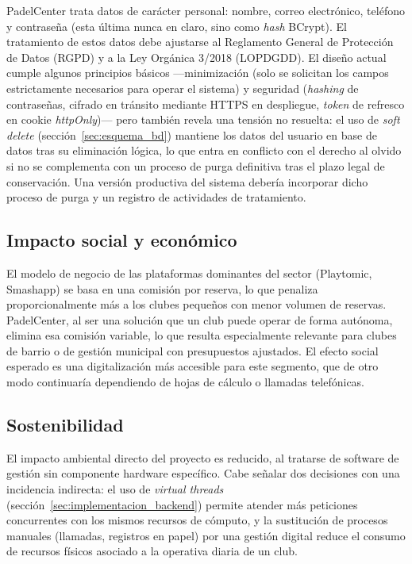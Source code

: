 PadelCenter trata datos de carácter personal: nombre, correo electrónico,
teléfono y contraseña (esta última nunca en claro, sino como \textit{hash}
BCrypt). El tratamiento de estos datos debe ajustarse al Reglamento General de
Protección de Datos (RGPD) y a la Ley Orgánica 3/2018 (LOPDGDD). El diseño
actual cumple algunos principios básicos —minimización (solo se solicitan los
campos estrictamente necesarios para operar el sistema) y seguridad
(\textit{hashing} de contraseñas, cifrado en tránsito mediante HTTPS en
despliegue, \textit{token} de refresco en cookie \textit{httpOnly})— pero
también revela una tensión no resuelta: el uso de \textit{soft delete}
(sección~\ref{sec:esquema_bd}) mantiene los datos del usuario en base de datos
tras su eliminación lógica, lo que entra en conflicto con el derecho al olvido
si no se complementa con un proceso de purga definitiva tras el plazo legal de
conservación. Una versión productiva del sistema debería incorporar dicho
proceso de purga y un registro de actividades de tratamiento.

\subsection{Impacto social y económico}

El modelo de negocio de las plataformas dominantes del sector (Playtomic,
Smashapp) se basa en una comisión por reserva, lo que penaliza
proporcionalmente más a los clubes pequeños con menor volumen de reservas.
PadelCenter, al ser una solución que un club puede operar de forma autónoma,
elimina esa comisión variable, lo que resulta especialmente relevante para
clubes de barrio o de gestión municipal con presupuestos ajustados. El efecto
social esperado es una digitalización más accesible para este segmento, que
de otro modo continuaría dependiendo de hojas de cálculo o llamadas
telefónicas.

\subsection{Sostenibilidad}

El impacto ambiental directo del proyecto es reducido, al tratarse de software
de gestión sin componente hardware específico. Cabe señalar dos decisiones con
una incidencia indirecta: el uso de \textit{virtual threads}
(sección~\ref{sec:implementacion_backend}) permite atender más peticiones
concurrentes con los mismos recursos de cómputo, y la sustitución de procesos
manuales (llamadas, registros en papel) por una gestión digital reduce el
consumo de recursos físicos asociado a la operativa diaria de un club.

